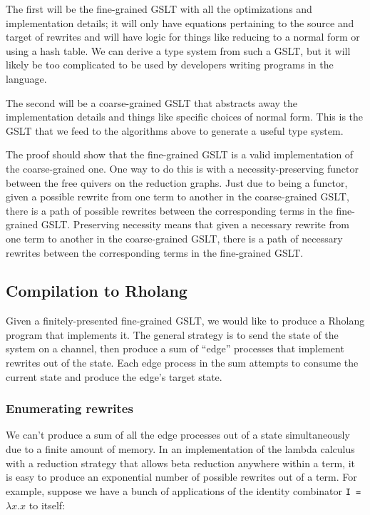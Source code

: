 \documentclass{article}
\begin{document}
The first will be the fine-grained GSLT with all the optimizations and implementation details; it will only have equations pertaining to the source and target of rewrites and will have logic for things like reducing to a normal form or using a hash table.  We can derive a type system from such a GSLT, but it will likely be too complicated to be used by developers writing programs in the language.

The second will be a coarse-grained GSLT that abstracts away the implementation details and things like specific choices of normal form.  This is the GSLT that we feed to the algorithms above to generate a useful type system.

The proof should show that the fine-grained GSLT is a valid implementation of the coarse-grained one.  One way to do this is with a necessity-preserving functor between the free quivers on the reduction graphs.  Just due to being a functor, given a possible rewrite from one term to another in the coarse-grained GSLT, there is a path of possible rewrites between the corresponding terms in the fine-grained GSLT. Preserving necessity means that given a necessary rewrite from one term to another in the coarse-grained GSLT, there is a path of necessary rewrites between the corresponding terms in the fine-grained GSLT.

\subsection{Compilation to Rholang}
\label{comp_to_rholang}

Given a finitely-presented fine-grained GSLT, we would like to produce a Rholang program that implements it.  The general strategy is to send the state of the system on a channel, then produce a sum of ``edge'' processes that implement rewrites out of the state.  Each edge process in the sum attempts to consume the current state and produce the edge's target state.

\subsubsection{Enumerating rewrites}
\label{enum_rewrites}

We can't produce a sum of all the edge processes out of a state simultaneously due to a finite amount of memory.  In an implementation of the lambda calculus with a reduction strategy that allows beta reduction anywhere within a term, it is easy to produce an exponential number of possible rewrites out of a term.  For example, suppose we have a bunch of applications of the identity combinator \verb+I = +$\lambda x.x$ to itself:
\end{document}
